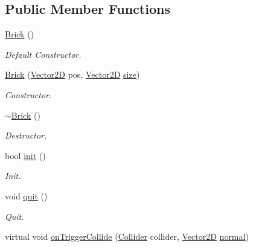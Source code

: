 \subsection*{Public Member Functions}
\begin{DoxyCompactItemize}
\item 
\mbox{\label{class_brick_aa29d678c3d901c7b18cbc3a27a51be17}} 
\mbox{\hyperlink{class_brick_aa29d678c3d901c7b18cbc3a27a51be17}{Brick}} ()
\begin{DoxyCompactList}\small\item\em Default Constructor. \end{DoxyCompactList}\item 
\mbox{\hyperlink{class_brick_afd403150589ffadc229a922753ff3b27}{Brick}} (\mbox{\hyperlink{struct_vector2_d}{Vector2D}} pos, \mbox{\hyperlink{struct_vector2_d}{Vector2D}} \mbox{\hyperlink{class_brick_a89dbb0d6711a2af71500f700d90fcbe1}{size}})
\begin{DoxyCompactList}\small\item\em Constructor. \end{DoxyCompactList}\item 
\mbox{\label{class_brick_a0e27476ccaeaed1d61a06bddf247c8ee}} 
\mbox{\hyperlink{class_brick_a0e27476ccaeaed1d61a06bddf247c8ee}{$\sim$\+Brick}} ()
\begin{DoxyCompactList}\small\item\em Destructor. \end{DoxyCompactList}\item 
\mbox{\label{class_brick_af601ed78c7e4156629ed5ec4486e82fa}} 
bool \mbox{\hyperlink{class_brick_af601ed78c7e4156629ed5ec4486e82fa}{init}} ()
\begin{DoxyCompactList}\small\item\em Init. \end{DoxyCompactList}\item 
\mbox{\label{class_brick_a2593e490d0698d7896658418fc2f780d}} 
void \mbox{\hyperlink{class_brick_a2593e490d0698d7896658418fc2f780d}{quit}} ()
\begin{DoxyCompactList}\small\item\em Quit. \end{DoxyCompactList}\item 
virtual void \mbox{\hyperlink{class_brick_a37283bddbec3378192f5e8782e6f51a7}{on\+Trigger\+Collide}} (\mbox{\hyperlink{class_collider}{Collider}} collider, \mbox{\hyperlink{struct_vector2_d}{Vector2D}} \mbox{\hyperlink{class_collider_a9326e2676880c40f35832ed2c6d6b073}{normal}})

\end{DoxyCompactItemize}
